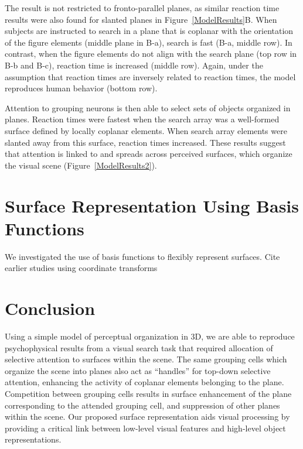 The result is not restricted to fronto-parallel planes, as similar reaction time results were also found for slanted planes in Figure~\ref{ModelResults}B. When subjects are instructed to search in
a plane that is coplanar with the orientation of the figure elements
(middle plane in B-a), search is fast (B-a, middle row). In contrast,
when the figure elements do not align with the search plane (top row in B-b and B-c), reaction time is increased (middle row). Again, under the assumption that reaction times are inversely related to reaction times, the model reproduces human behavior (bottom row).

Attention to grouping neurons is then able to select sets of objects
organized in planes. Reaction times were fastest when the search array was a well-formed surface defined by locally coplanar elements. When search array elements were slanted away from this surface, reaction times increased. These results suggest that attention is linked to and spreads across perceived surfaces, which organize the visual scene
(Figure~\ref{ModelResults2}). 

\section{Surface Representation Using Basis Functions}
We investigated the use of basis functions to flexibly represent surfaces. Cite earlier studies using coordinate transforms

\section{Conclusion}
Using a simple model of perceptual organization in 3D,  we are able to reproduce psychophysical results from a visual search task that required allocation of selective attention to surfaces within the scene. The same grouping cells which organize the scene into planes also act as ``handles'' for top-down selective attention, enhancing the activity of coplanar elements belonging to the plane. Competition between grouping cells results in surface enhancement of the plane
corresponding to the attended grouping cell, and suppression of other
planes within the scene. Our proposed surface representation aids visual processing by providing a critical link between low-level
visual features and high-level object representations.